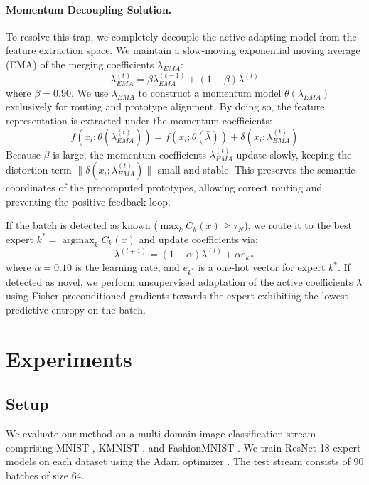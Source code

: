 \documentclass{article}
\theoremstyle{plain}
\theoremstyle{definition}
\theoremstyle{remark}
\begin{document}
\paragraph{Momentum Decoupling Solution.}
To resolve this trap, we completely decouple the active adapting model from the feature extraction space. We maintain a slow-moving exponential moving average (EMA) of the merging coefficients $\lambda_{EMA}$:
\begin{equation}
    \lambda_{EMA}^{(t)} = \beta \lambda_{EMA}^{(t-1)} + (1 - \beta) \lambda^{(t)}
\end{equation}
where $\beta = 0.90$. We use $\lambda_{EMA}$ to construct a momentum model $\theta(\lambda_{EMA})$ exclusively for routing and prototype alignment. By doing so, the feature representation is extracted under the momentum coefficients:
\begin{equation}
    f(x_i; \theta(\lambda_{EMA}^{(t)})) = f(x_i; \theta(\bar{\lambda})) + \delta(x_i; \lambda_{EMA}^{(t)})
\end{equation}
Because $\beta$ is large, the momentum coefficients $\lambda_{EMA}^{(t)}$ update slowly, keeping the distortion term $\|\delta(x_i; \lambda_{EMA}^{(t)})\|$ small and stable. This preserves the semantic coordinates of the precomputed prototypes, allowing correct routing and preventing the positive feedback loop.

If the batch is detected as known ($\max_k C_k(x) \geq \tau_N$), we route it to the best expert $k^* = \operatorname{argmax}_k C_k(x)$ and update coefficients via:
\begin{equation}
    \lambda^{(t+1)} = (1 - \alpha) \lambda^{(t)} + \alpha e_{k*}
\end{equation}
where $\alpha = 0.10$ is the learning rate, and $e_{k^*}$ is a one-hot vector for expert $k^*$. If detected as novel, we perform unsupervised adaptation of the active coefficients $\lambda$ using Fisher-preconditioned gradients towards the expert exhibiting the lowest predictive entropy on the batch.

\section{Experiments}

\subsection{Setup}
We evaluate our method on a multi-domain image classification stream comprising MNIST \cite{lecun1998gradient}, KMNIST \cite{clanuwat2018deep}, and FashionMNIST \cite{xiao2017fashionmnist}. We train ResNet-18 expert models on each dataset using the Adam optimizer \cite{kingma2014adam}. The test stream consists of 90 batches of size 64. 
\end{document}
